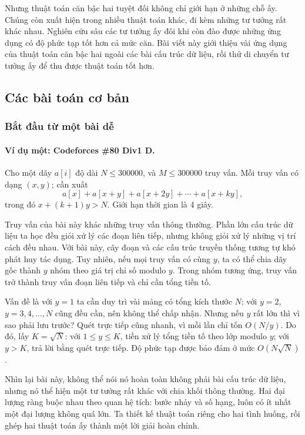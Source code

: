 \documentclass[11pt]{article}
\begin{document}
Nhưng thuật toán căn bậc hai tuyệt đối không chỉ giới hạn ở những chỗ ấy. Chúng
còn xuất hiện trong nhiều thuật toán khác, đi kèm những tư tưởng rất khác nhau.
Nghiên cứu sâu các tư tưởng ấy đôi khi còn đào được những ứng dụng có độ phức
tạp tốt hơn cả mức căn. Bài viết này giới thiệu vài ứng dụng của thuật toán căn
bậc hai ngoài các bài cấu trúc dữ liệu, rồi thử di chuyển tư tưởng ấy để thu
được thuật toán tốt hơn.

\subsection{Các bài toán cơ bản}

\subsubsection{Bắt đầu từ một bài dễ}

\paragraph{Ví dụ một: Codeforces \#80 Div1 D.}
Cho một dãy \(a[i]\) độ dài \(N\le 300000\), và \(M\le 300000\) truy vấn. Mỗi
truy vấn có dạng \((x,y)\); cần xuất
\[
  a[x]+a[x+y]+a[x+2y]+\cdots+a[x+ky],
\]
trong đó \(x+(k+1)y>N\). Giới hạn thời gian là 4 giây.

Truy vấn của bài này khác những truy vấn thông thường. Phần lớn cấu trúc dữ
liệu ta học đều giỏi xử lý các đoạn liên tiếp, nhưng không giỏi xử lý những vị
trí cách đều nhau. Với bài này, cây đoạn và các cấu trúc truyền thống tương tự
khó phát huy tác dụng. Tuy nhiên, nếu mọi truy vấn có cùng \(y\), ta có thể
chia dãy gốc thành \(y\) nhóm theo giá trị chỉ số modulo \(y\). Trong nhóm
tương ứng, truy vấn trở thành truy vấn đoạn liên tiếp và chỉ cần tổng tiền tố.

Vấn đề là với \(y=1\) ta cần duy trì vài mảng có tổng kích thước \(N\); với
\(y=2\), \(y=3,4,\ldots,N\) cũng đều cần, nên không thể chấp nhận. Nhưng nếu
\(y\) rất lớn thì vì sao phải lưu trước? Quét trực tiếp cũng nhanh, vì mỗi lần
chỉ tốn \(O(N/y)\). Do đó, lấy \(K=\sqrt N\): với \(1\le y\le K\), tiền xử lý
tổng tiền tố theo lớp modulo \(y\); với \(y>K\), trả lời bằng quét trực tiếp.
Độ phức tạp được bảo đảm ở mức \(O(N\sqrt N)\).

Nhìn lại bài này, không thể nói nó hoàn toàn không phải bài cấu trúc dữ liệu,
nhưng nó thể hiện một tư tưởng rất khác với chia khối thông thường. Hai đại
lượng ràng buộc nhau theo quan hệ tích: bước nhảy và số hạng, luôn có ít nhất
một đại lượng không quá lớn. Ta thiết kế thuật toán riêng cho hai tình huống,
rồi ghép hai thuật toán ấy thành một lời giải hoàn chỉnh.
\end{document}
